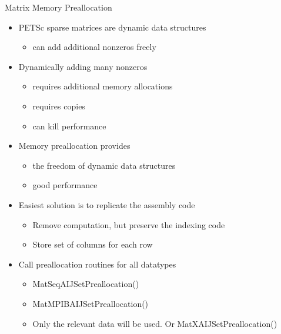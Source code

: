 \begin{frame}{Matrix Memory Preallocation}
\begin{itemize}
  \item PETSc sparse matrices are dynamic data structures
  \begin{itemize}
    \item can add additional nonzeros freely
  \end{itemize}

  \item Dynamically adding many nonzeros
  \begin{itemize}
    \item requires additional memory allocations
    \item requires copies
    \item can kill performance
  \end{itemize}

  \item Memory preallocation provides
  \begin{itemize}
    \item the freedom of dynamic data structures
    \item good performance
  \end{itemize}

  \item Easiest solution is to replicate the assembly code
  \begin{itemize}
    \item Remove computation, but preserve the indexing code
    \item Store set of columns for each row
  \end{itemize}

  \item Call preallocation routines for all datatypes
  \begin{itemize}
    \item {\kb MatSeqAIJSetPreallocation()}
    \item {\kb MatMPIBAIJSetPreallocation()}
    \item Only the relevant data will be used.  Or {\kb MatXAIJSetPreallocation()}
  \end{itemize}
\end{itemize}
\end{frame}


